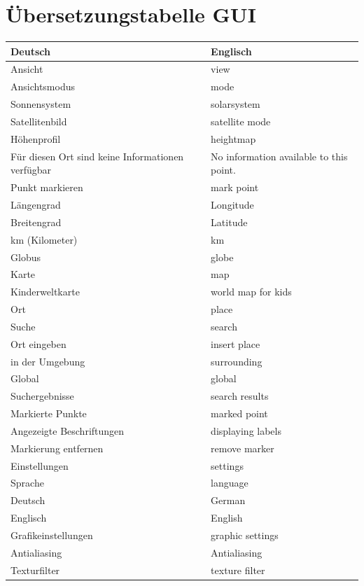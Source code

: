 \documentclass[10pt]{scrreprt}
\begin{document}
\section{Übersetzungstabelle GUI}
\begin{longtable}{|p{7.5cm}|p{7.5cm}|}
\hline 
\textbf{Deutsch} & \textbf{Englisch} \\ 
\hline
\hline 
Ansicht & view \\ 
\hline
Ansichtsmodus & mode \\ 
\hline
Sonnensystem & solarsystem \\
\hline
Satellitenbild & satellite mode \\
\hline
Höhenprofil & heightmap \\
\hline
Für diesen Ort sind keine Informationen verfügbar & No information available to this point. \\
\hline
Punkt markieren & mark point\\
\hline
Längengrad & Longitude \\
\hline
Breitengrad & Latitude \\
\hline
km (Kilometer) & km \\
\hline
Globus & globe \\
\hline
Karte & map \\
\hline
Kinderweltkarte & world map for kids \\
\hline
Ort & place \\
\hline
Suche & search \\
\hline
Ort eingeben & insert place \\
\hline
in der Umgebung & surrounding \\
\hline
Global & global \\
\hline
Suchergebnisse & search results \\
\hline
Markierte Punkte & marked point \\
\hline
Angezeigte Beschriftungen & displaying labels \\
\hline
Markierung entfernen & remove marker \\
\hline
Einstellungen & settings \\
\hline
Sprache & language \\
\hline
Deutsch & German \\
\hline
Englisch & English \\
\hline
Grafikeinstellungen & graphic settings \\
\hline
Antialiasing & Antialiasing \\
\hline
Texturfilter & texture filter \\

\end{longtable}
\end{document}
